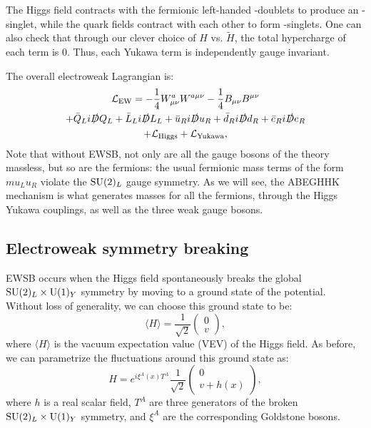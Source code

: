 The Higgs field contracts with the fermionic left-handed \SU[2]-doublets to produce an \SU[2]-singlet, while the quark fields contract with each other to form \SU[3]-singlets.
One can also check that through our clever choice of $H$ vs. $\tilde H$, the total hypercharge of each term is $0$.
Thus, each Yukawa term is independently gauge invariant.

The overall electroweak Lagrangian is:
\begin{multline}
	\label{eq:01_sm_ew_lagrangian}
	\mathcal{L}_\mathrm{EW} = -\frac{1}{4} W^a_{\mu\nu} W^{a\mu\nu} - \frac{1}{4} B_{\mu\nu} B^{\mu\nu} \\ 
	+ \bar{Q}_L i \slashed{D} Q_L + \bar{L}_L i \slashed{D} L_L + \bar{u}_R i \slashed{D} u_R + \bar{d}_R i \slashed{D} d_R + \bar{e}_R i \slashed{D} e_R \\
	+ \mathcal{L}_\mathrm{Higgs} + \mathcal{L}_\mathrm{Yukawa},
\end{multline}
Note that without EWSB, not only are all the gauge bosons of the theory massless, but so are the fermions:
the usual fermionic mass terms of the form $m u_L u_R$ violate the $\SU[2]_L$ gauge symmetry.
As we will see, the ABEGHHK mechanism is what generates masses for all the fermions, through the Higgs Yukawa couplings, as well as the three weak gauge bosons.

\subsection{Electroweak symmetry breaking}
\label{sec:01_sm_ew_ewsb}

EWSB occurs when the Higgs field spontaneously breaks the global $\SU[2]_L \times \UU[1]_Y$ symmetry by moving to a ground state of the potential.
Without loss of generality, we can choose this ground state to be:
\begin{equation}
	\label{eq:01_sm_ew_higgs_vev}
	\langle H \rangle = \frac{1}{\sqrt{2}} \begin{pmatrix} 0 \\ v \end{pmatrix},
\end{equation}
where $\langle H \rangle$ is the vacuum expectation value (VEV) of the Higgs field.
As before, we can parametrize the fluctuations around this ground state as:
\begin{equation}
	\label{eq:01_sm_ew_higgs_fluctuations}
	H = e^{i \xi^A(x)T^A}
	\frac{1}{\sqrt{2}} \begin{pmatrix} 0 \\ v + h(x) \end{pmatrix},
\end{equation}
where $h$ is a real scalar field, $T^A$ are three generators of the broken $\SU[2]_L \times \UU[1]_Y$ symmetry, and $\xi^A$ are the corresponding Goldstone bosons.

